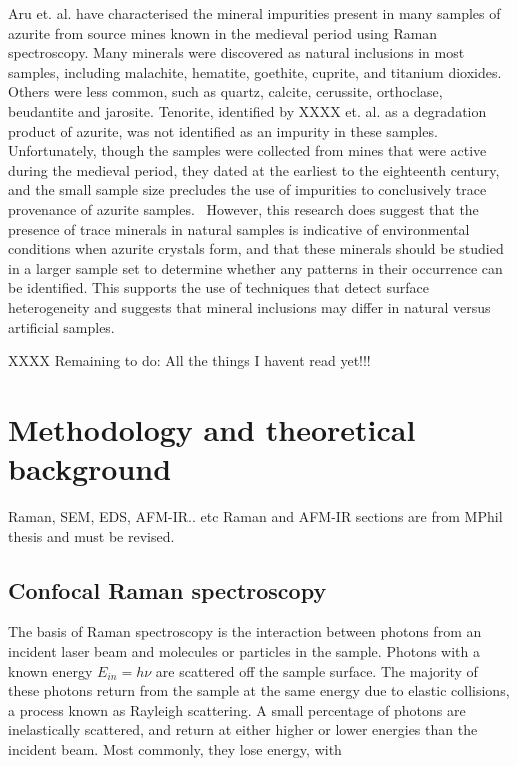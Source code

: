 Aru et. al. have characterised the mineral impurities present in many samples of azurite from source mines known in the medieval period using Raman spectroscopy. Many minerals were discovered as natural inclusions in most samples, including malachite, hematite, goethite, cuprite, and titanium dioxides. Others were less common, such as quartz, calcite, cerussite, orthoclase, beudantite and jarosite. Tenorite, identified by XXXX et. al. as a degradation product of azurite, was not identified as an impurity in these samples. Unfortunately, though the samples were collected from mines that were active during the medieval period, they dated at the earliest to the eighteenth century, and the small sample size precludes the use of impurities to conclusively trace provenance of azurite samples.~\cite{aru} However, this research does suggest that the presence of trace minerals in natural samples is indicative of environmental conditions when azurite crystals form, and that these minerals should be studied in a larger sample set to determine whether any patterns in their occurrence can be identified. This supports the use of techniques that detect surface heterogeneity and suggests that mineral inclusions may differ in natural versus artificial samples.

XXXX Remaining to do: All the things I havent read yet!!!

\section[Methodology and theoretical background]{Methodology and theoretical background}
\label{section1.2}

Raman, SEM, EDS, AFM-IR.. etc
Raman and AFM-IR sections are from MPhil thesis and must be revised.

\subsection[Confocal Raman spectroscopy]{Confocal Raman spectroscopy}
\label{subsection1.2.2}

The basis of Raman spectroscopy is the interaction between photons from an incident laser beam and molecules or particles in the sample. Photons with a known energy $E_{in} = h\nu$ are scattered off the sample surface. The majority of these  photons return from the sample at the same energy due to elastic collisions, a process known as Rayleigh scattering. A small percentage of photons are inelastically scattered, and return at either higher or lower energies than the incident beam. Most commonly, they lose energy, with 

